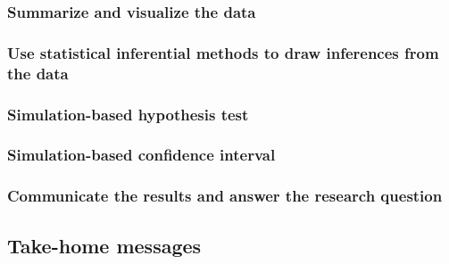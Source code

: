 \documentclass[
]{report}
\begin{document}
\hypertarget{summarize-and-visualize-the-data-5}{%
\subsubsection*{Summarize and visualize the data}\label{summarize-and-visualize-the-data-5}}

\hypertarget{use-statistical-inferential-methods-to-draw-inferences-from-the-data-5}{%
\subsubsection*{Use statistical inferential methods to draw inferences from the data}\label{use-statistical-inferential-methods-to-draw-inferences-from-the-data-5}}

\hypertarget{simulation-based-hypothesis-test}{%
\subsubsection*{Simulation-based hypothesis test}\label{simulation-based-hypothesis-test}}

\hypertarget{simulation-based-confidence-interval}{%
\subsubsection*{Simulation-based confidence interval}\label{simulation-based-confidence-interval}}

\hypertarget{communicate-the-results-and-answer-the-research-question-4}{%
\subsubsection*{Communicate the results and answer the research question}\label{communicate-the-results-and-answer-the-research-question-4}}

\hypertarget{take-home-messages-20}{%
\subsection{Take-home messages}\label{take-home-messages-20}}
\end{document}
